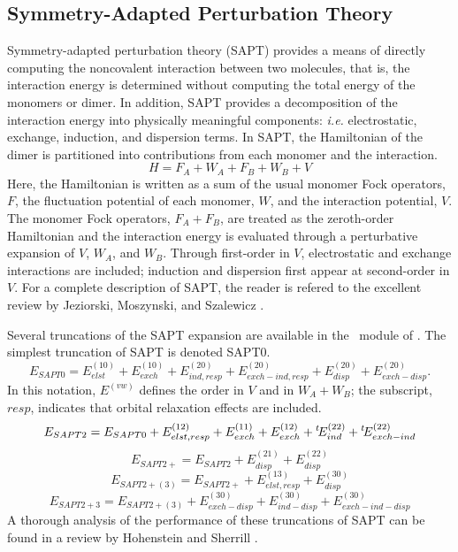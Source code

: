 \subsection{Symmetry-Adapted Perturbation Theory} \label{sec:sapt}
\renewcommand{\optionname}[2]{\texttt{\nameref{op-#2-#1}}}

Symmetry-adapted perturbation theory (SAPT) provides a means of directly
computing the noncovalent interaction between two molecules, that is, the
interaction energy is determined without computing the total energy of the
monomers or dimer. In addition, SAPT provides a decomposition of the
interaction energy into physically meaningful components: {\em i.e.}
electrostatic, exchange, induction, and dispersion terms. In SAPT, the 
Hamiltonian of the dimer is partitioned into contributions from each 
monomer and the interaction.
\begin{equation}
H=F_A+W_A+F_B+W_B+V
\end{equation}
Here, the Hamiltonian is written as a sum of the usual monomer Fock
operators, $F$, the fluctuation potential of each monomer, $W$, and the
interaction potential, $V$. The monomer Fock operators, $F_A+F_B$, are
treated as the zeroth-order Hamiltonian and the interaction energy is
evaluated through a perturbative expansion of $V$, $W_A$, and $W_B$. 
Through first-order in $V$, electrostatic and exchange interactions are
included; induction and dispersion first appear at second-order in $V$. For
a complete description of SAPT, the reader is refered to the excellent
review by Jeziorski, Moszynski, and Szalewicz \cite{Jeziorski:1994:1887}.

Several truncations of the SAPT expansion are available in the \PSIsapt\
module of \PSIfour. The simplest truncation of SAPT is denoted SAPT0.
\begin{equation}
\label{eqn:SAPT0}
E_{SAPT0} = E_{elst}^{(10)} + E_{exch}^{(10)} + E_{ind,resp}^{(20)} +
E_{exch-ind,resp}^{(20)} + E_{disp}^{(20)} + E_{exch-disp}^{(20)}.
\end{equation}
In this notation, $E^{(vw)}$ defines the order in $V$ and in $W_A+W_B$; the
subscript, $resp$, indicates that orbital relaxation effects are included.
\begin{equation}
\label{eqn:SAPT2}
E_{SAPT2} = E_{SAPT0} + E_{elst,resp}^{(12)} + E_{exch}^{(11)} +
E_{exch}^{(12)} +\/ ^{t}\!E_{ind}^{(22)} +\/ ^{t}\!E_{exch-ind}^{(22)}
\end{equation}
\begin{equation}
\label{eqn:SAPT2+}
E_{SAPT2+} = E_{SAPT2} + E_{disp}^{(21)} + E_{disp}^{(22)}
\end{equation}
\begin{equation}
\label{eqn:SAPT2+p3}
E_{SAPT2+(3)} = E_{SAPT2+} + E_{elst,resp}^{(13)} + E_{disp}^{(30)}
\end{equation}
\begin{equation}
\label{eqn:SAPT2+3}
E_{SAPT2+3} = E_{SAPT2+(3)}
+ E_{exch-disp}^{(30)} + E_{ind-disp}^{(30)} + E_{exch-ind-disp}^{(30)}
\end{equation}
A thorough analysis of the performance of these truncations of SAPT can be
found in a review by Hohenstein and Sherrill \cite{Hohenstein:2012:WIREs}.

